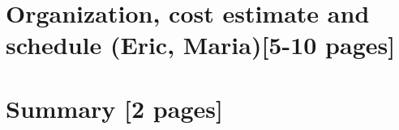\ifdefined\isfinal\documentclass[final]{pd-tdr}\else\documentclass{pd-tdr}\fi
\begin{document}
\chapter{Organization, cost estimate and schedule {\color{red} (Eric, Maria)[5-10 pages]}}



%
% 


\newpage
\chapter{Summary {\color{red}[2 pages]}}
%



% 

\cleardoublepage


\end{document}
